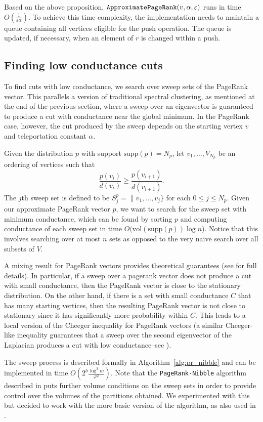 \documentclass[11pt]{article}
\begin{document}
Based on the above proposition, ${\tt ApproximatePageRank}(v,\alpha,\varepsilon)$ runs in time $O\left( \frac{1}{\varepsilon\alpha}\right)$. To achieve this time complexity, the implementation needs to maintain a queue containing all vertices eligible for the push operation. The queue is updated, if necessary, when an element of $r$ is changed within a push.


\subsection*{Finding low conductance cuts}

To find cuts with low conductance, we search over sweep sets of the PageRank vector. This parallels a version of traditional spectral clustering, as mentioned at the end of the previous section, where a sweep over an eigenvector is guaranteed to produce a cut with conductance near the global minimum. In the PageRank case, however, the cut produced by the sweep depends on the starting vertex $v$ and teleportation constant $\alpha$.

Given the distribution $p$ with support $\text{supp}(p) = N_p$, let $v_1,\ldots,V_{N_p}$ be an ordering of vertices such that
$$\frac{p(v_i)}{d(v_i)} \geq \frac{p(v_{i+1})}{d(v_{i+1})}.$$
The $j$th sweep set is defined to be $S_j^p = \|v_1,\ldots,v_j\}$ for each $0\leq j\leq N_p$. Given our approximate PageRank vector $p$, we want to search for the sweep set with minimum conductance, which can be found by sorting $p$ and computing conductance of each sweep set in time $O\Big(\text{vol}(\text{supp}(p)) \log n \Big)$. Notice that this involves searching over at most $n$ sets as opposed to the very naive search over all subsets of $V$.

A mixing result for PageRank vectors provides theoretical guarantees (see \cite{pagerank_cluster} for full details). In particular, if a sweep over a pagerank vector does not produce a cut with small conductance, then the PageRank vector is close to the stationary distribution. On the other hand, if there is a set with small conductance $C$ that has many starting vertices, then the resulting PageRank vector is not close to stationary since it has significantly more probability within $C$. This leads to a local version of the Cheeger inequality for PageRank vectors (a similar Cheeger-like inequality guarantees that a sweep over the second eigenvector of the Laplacian produces a cut with low conductance--see \cite{spielman_clustering_works}).

The sweep process is described formally in Algorithm~\ref{alg:pr_nibble} and can be implemented in time $O\left( 2^b \frac{\log^3 m}{\varphi^2}\right)$. Note that the {\tt PageRank-Nibble} algorithm described in \cite{pagerank_cluster} puts further volume conditions on the sweep sets in order to provide control over the volumes of the partitions obtained. We experimented with this but decided to work with the more basic version of the algorithm, as also used in \cite{benson}.
\end{document}
